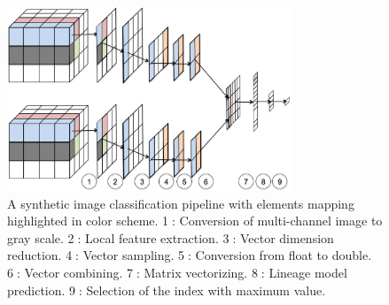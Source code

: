 \documentclass{sig-alternate}
\newenvironment{shortlist}{
        \vspace*{-0.5em}
  \begin{itemize}
  \setlength{\itemsep}{-0.1em}
}{
  \end{itemize}
        \vspace*{-0.5em}
}
\begin{document}
\begin{figure}[h]
\begin{center}
    \includegraphics[width=85mm]{pictures/Conceptual}
    \caption {A synthetic image classification pipeline with elements mapping highlighted in color scheme. 
    \textcircled{1}: Conversion of multi-channel image to gray scale.
    \textcircled{2}: Local feature extraction.
    \textcircled{3}: Vector dimension reduction.
    \textcircled{4}: Vector sampling.
    \textcircled{5}: Conversion from float to double.
    \textcircled{6}: Vector combining.
    \textcircled{7}: Matrix vectorizing.
    \textcircled{8}: Lineage model prediction.
    \textcircled{9}: Selection of the index with maximum value.
    \label{fig:conceptual}
}
\end{center}
\end{figure}



\end{document}
